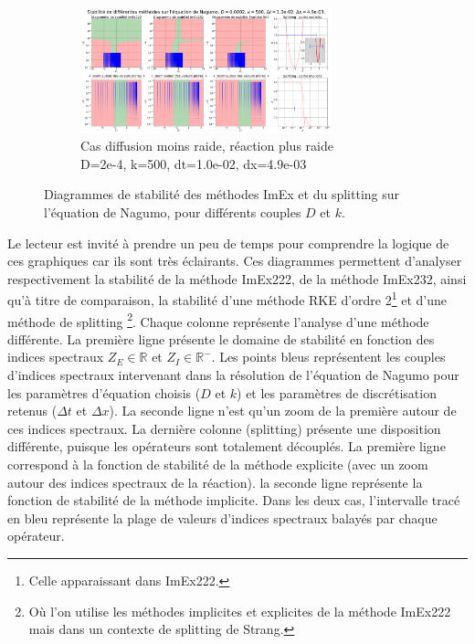 \begin{figure}[htbp]
        \begin{subfigure}{\textwidth}
            \centering
            \includegraphics[width=0.8\textwidth]{media/4_travail/2_nagumo/stabilite/STABILITE_D0.0002_k500_dt1.0e-02_dx4.9e-03.png}
            \caption{Cas diffusion moins raide, réaction plus raide\\D=2e-4, k=500, dt=1.0e-02, dx=4.9e-03}
            \label{fig:stabilite_nagumo_c}
        \end{subfigure}
        
        \caption{Diagrammes de stabilité des méthodes ImEx et du splitting sur l'équation de Nagumo, pour différents couples $D$ et $k$.}
        \label{fig:stabilite_nagumo}
    \end{figure}

        Le lecteur est invité à prendre un peu de temps pour comprendre la logique de ces graphiques car ils sont très éclairants. 
        Ces diagrammes permettent d'analyser respectivement la stabilité de la méthode ImEx222, de la méthode ImEx232, 
        ainsi qu'à titre de comparaison, la stabilité d'une méthode RKE d'ordre 2\footnote{Celle apparaissant dans ImEx222.} 
        et d'une méthode de splitting
        \footnote{Où l'on utilise les méthodes implicites et explicites de la méthode ImEx222 mais dans un contexte de splitting de Strang.}.
        Chaque colonne représente l'analyse d'une méthode différente.
        La première ligne présente le domaine de stabilité en fonction des indices spectraux $Z_E \in \mathbb{R}$ et $Z_I \in \mathbb{R}^-$. 
        Les points bleus représentent les couples d'indices spectraux intervenant dans la résolution de l'équation de Nagumo 
        pour les paramètres d'équation choisis ($D$ et $k$) et les paramètres de discrétisation retenus ($\Delta t$ et $\Delta x$). 
        La seconde ligne n'est qu'un zoom de la première autour de ces indices spectraux. 
        La dernière colonne (splitting) présente une disposition différente, puisque les opérateurs sont totalement découplés.
        La première ligne correspond à la fonction de stabilité de la méthode explicite (avec un zoom autour des indices spectraux de la réaction).
        la seconde ligne représente la fonction de stabilité de la méthode implicite. 
        Dans les deux cas, l'intervalle tracé en bleu représente la plage de valeurs d'indices spectraux balayés par chaque opérateur.

